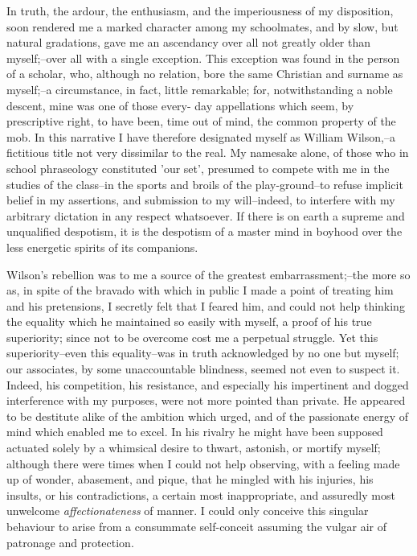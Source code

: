 \documentclass[12pt]{book}
\begin{document}
     In truth, the ardour, the enthusiasm, and the imperiousness of
my disposition, soon rendered me a marked character among my
schoolmates, and by slow, but natural gradations, gave me an
ascendancy over all not greatly older than myself;--over all with
a single exception.  This exception was found in the person of a
scholar, who, although no relation, bore the same Christian and
surname as myself;--a circumstance, in fact, little remarkable;
for, notwithstanding a noble descent, mine was one of those every-
day appellations which seem, by prescriptive right, to have been,
time out of mind, the common property of the mob.  In this
narrative I have therefore designated myself as William Wilson,--a
fictitious title not very dissimilar to the real.  My namesake
alone, of those who in school phraseology constituted 'our set',
presumed to compete with me in the studies of the class--in the
sports and broils of the play-ground--to refuse implicit belief in
my assertions, and submission to my will--indeed, to interfere with
my arbitrary dictation in any respect whatsoever.  If there is on
earth a supreme and unqualified despotism, it is the despotism of
a master mind in boyhood over the less energetic spirits of its
companions.

     Wilson's rebellion was to me a source of the greatest
embarrassment;--the more so as, in spite of the bravado with which
in public I made a point of treating him and his pretensions, I
secretly felt that I feared him, and could not help thinking the
equality which he maintained so easily with myself, a proof
of his true superiority; since not to be overcome cost me a
perpetual struggle.  Yet this superiority--even this equality--was
in truth acknowledged by no one but myself; our associates, by some
unaccountable blindness, seemed not even to suspect it.  Indeed,
his competition, his resistance, and especially his impertinent and
dogged interference with my purposes, were not more pointed than
private.  He appeared to be destitute alike of the ambition which
urged, and of the passionate energy of mind which enabled me to
excel.  In his rivalry he might have been supposed actuated solely
by a whimsical desire to thwart, astonish, or mortify myself;
although there were times when I could not help observing, with a
feeling made up of wonder, abasement, and pique, that he mingled
with his injuries, his insults, or his contradictions, a certain
most inappropriate, and assuredly most unwelcome 
\emph{affectionateness} of manner.  I could only conceive this singular
behaviour to arise from a consummate self-conceit assuming the
vulgar air of patronage and protection.
\end{document}
